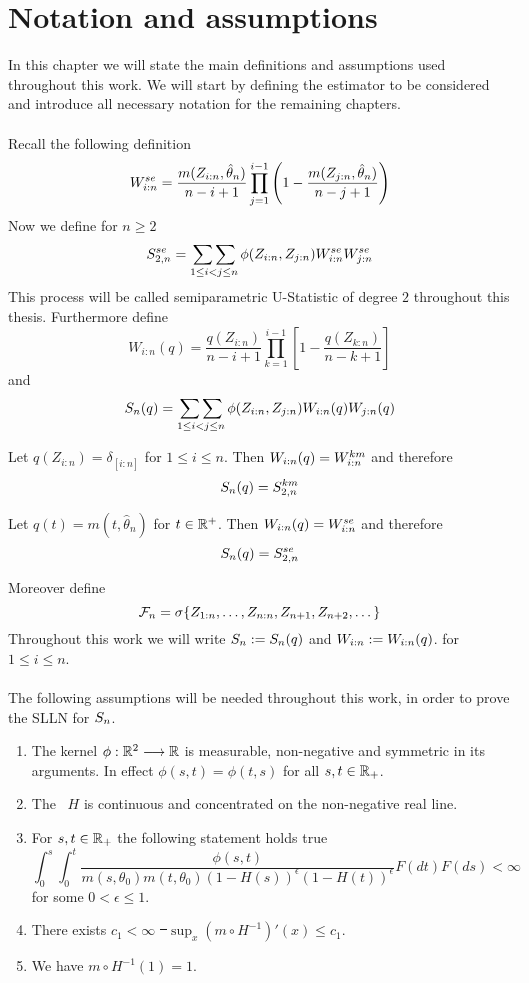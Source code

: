 \chapter{Notation and assumptions}
In this chapter we will state the main definitions and assumptions used throughout this work. We will start by defining the estimator to be considered and introduce all necessary notation for the remaining chapters.\\
\\
Recall the following definition
$$W_{i:n}^{se} = \frac{m(Z_{i:n}, \hat{\theta}_n)}{n-i+1} \prod\limits_{j=1}^{i-1}\left(1-\frac{m(Z_{j:n}, \hat{\theta}_n)}{n-j+1}\right)$$
%
Now we define for $n\geq2$
$$S_{2,n}^{se} = \mathop{\sum\sum}\limits_{1\leq i<j\leq n}\phi(Z_{i:n}, Z_{j:n})W_{i:n}^{se}W_{j:n}^{se}$$
This process will be called semiparametric U-Statistic of degree $2$ throughout this thesis.
%
Furthermore define
$$W_{i:n}(q) = \frac{q(Z_{i:n})}{n-i+1}\prod_{k=1}^{i-1}\left[1-\frac{q(Z_{k:n})}{n-k+1}\right]$$
and 
$$S_{n}(q) = \mathop{\sum\sum}\limits_{1\leq i<j\leq n}\phi(Z_{i:n}, Z_{j:n})W_{i:n}(q)W_{j:n}(q)$$
%
\begin{example}
	Let $q(Z_{i:n}) = \delta_{[i:n]}$ for $1\leq i\leq n$. Then $W_{i:n}(q) = W_{i:n}^{km}$ and therefore 
	$$S_n(q) = S_{2,n}^{km}$$
\end{example}
%
\begin{example}
	Let $q(t) = m(t, \hat\theta_n)$ for $t\in\mathbb{R}^+$. Then $W_{i:n}(q) = W_{i:n}^{se}$ and therefore 
	$$S_n(q) = S_{2,n}^{se}$$
\end{example}
%
\noindent Moreover define
$$\mathcal{F}_n = \sigma\{Z_{1:n}, \dots, Z_{n:n}, Z_{n+1}, Z_{n+2}, \dots\}$$
%
Throughout this work we will write $S_{n} := S_{n}(q)$ and $W_{i:n} := W_{i:n}(q)$.
for $1\leq i\leq n$.\\
\\
%
The following assumptions will be needed throughout this work, in order to prove the SLLN for $S_{n}$.
\begin{enumerate}[({A}1)]
	\item \label{ass:kernel_gen} The kernel $\phi: \mathbb{R}^2 \longrightarrow \mathbb{R}$ is measurable, non-negative and symmetric in its arguments. In effect $\phi(s,t) = \phi(t,s)$ for all $s,t \in \mathbb{R}_+$. 
	\item \label{ass:H_nonneg} The \df\ $H$ is continuous and concentrated on the non-negative real line.
	\item \label{ass:intgral_phi_q} For $s,t\in \mathbb{R}_+$ the following statement holds true
	$$\int_{0}^{s} \int_{0}^{t} \frac{\phi(s,t)}{m(s, \theta_0)m(t,\theta_0)(1-H(s))^\epsilon(1-H(t))^{\epsilon}} F(dt)F(ds) < \infty$$
	for some $0<\epsilon\leq 1$.
	\item \label{ass:sup_mprime} There exists $c_1 < \infty$ \st\ $\sup_{x} (m\circ H^{-1})'(x) \leq c_1$. 
	\item \label{ass:m_H_one} We have $m\circ H^{-1}(1) = 1$.
\end{enumerate}
